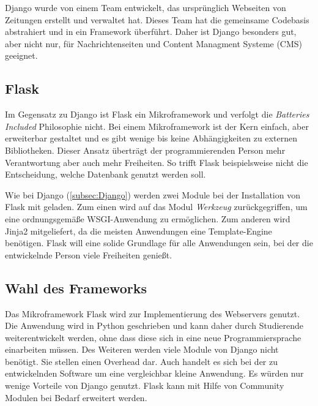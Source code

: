 Django wurde von einem Team entwickelt, das ursprünglich Webseiten von Zeitungen erstellt und verwaltet hat. Dieses Team hat die gemeinsame Codebasis abstrahiert und in ein Framework überführt. Daher ist Django besonders gut, aber nicht nur, für Nachrichtenseiten und Content Managment Systeme (CMS) geeignet. \cite{mdncontributorsDjangoIntroduction2019}

\subsection{Flask}
Im Gegensatz zu Django ist Flask ein Mikroframework und verfolgt die \textit{Batteries Included} Philosophie nicht. Bei einem Mikroframework ist der Kern einfach, aber erweiterbar gestaltet und es gibt wenige bis keine Abhängigkeiten zu externen Bibliotheken. Dieser Ansatz überträgt der programmierenden Person mehr Verantwortung aber auch mehr Freiheiten. So trifft Flask beispielsweise nicht die Entscheidung, welche Datenbank genutzt werden soll. \cite{palletsForewordFlaskDocumentation2010} 

Wie bei Django (\autoref{subsec:Django}) werden zwei Module bei der Installation von Flask mit geladen. Zum einen wird auf das Modul \textit{Werkzeug} zurückgegriffen, um eine ordnungsgemäße WSGI-Anwendung zu ermöglichen. Zum anderen wird Jinja2 mitgeliefert, da die meisten Anwendungen eine Template-Engine benötigen.
Flask will eine solide Grundlage für alle Anwendungen sein, bei der die entwickelnde Person viele Freiheiten genießt. \cite{palletsDesignDecisionsFlask2010}

\subsection{Wahl des Frameworks}

Das Mikroframework Flask wird zur Implementierung des Webservers genutzt. Die Anwendung wird in Python geschrieben und kann daher durch Studierende weiterentwickelt werden, ohne dass diese sich in eine neue Programmiersprache einarbeiten müssen. Des Weiteren werden viele Module von Django nicht benötigt. Sie stellen einen Overhead dar. Auch handelt es sich bei der zu entwickelnden Software um eine vergleichbar kleine Anwendung. Es würden nur wenige Vorteile von Django genutzt. Flask kann mit Hilfe von Community Modulen bei Bedarf erweitert werden.